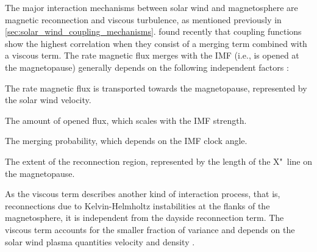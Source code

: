 The major interaction mechanisms between solar wind and magnetosphere are magnetic reconnection and viscous turbulence, as mentioned previously in \autoref{sec:solar_wind_coupling_mechanisms}. \citet{Newell2008} found recently that coupling functions show the highest correlation when they consist of a merging term combined with a viscous term.
The rate magnetic flux merges with the IMF (i.e., is opened at the magnetopause) generally depends on the following independent factors \citep{Newell2007}:
\begin{itemize*}
	\item The rate magnetic flux is transported towards the magnetopause, represented by the solar wind velocity.
	\item The amount of opened flux, which scales with the IMF strength.
	\item The merging probability, which depends on the IMF clock angle.
	\item The extent of the reconnection region, represented by the length of the X"~line on the magnetopause.
\end{itemize*}
As the viscous term describes another kind of interaction process, that is, reconnections due to Kelvin-Helm\-holtz instabilities at the flanks of the magnetosphere, it is independent from the dayside reconnection term. The viscous term accounts for the smaller fraction of variance and depends on the solar wind plasma quantities velocity and density \citep{Newell2008}.

